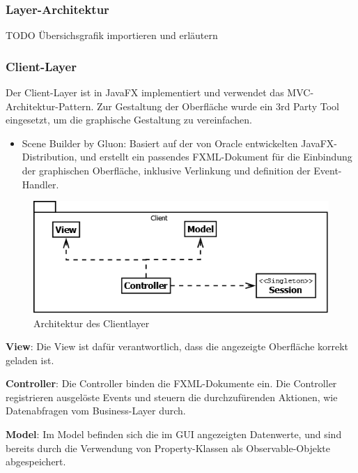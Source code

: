 \subsubsection{Layer-Architektur}
TODO Übersichsgrafik importieren und erläutern

\subsubsection{Client-Layer}
Der Client-Layer ist in JavaFX implementiert und verwendet das MVC-Architektur-Pattern. Zur Gestaltung der Oberfläche wurde ein 3rd Party Tool eingesetzt, um die graphische Gestaltung zu vereinfachen.
\begin{itemize}
\item Scene Builder by Gluon: Basiert auf der von Oracle entwickelten JavaFX-Distribution, und erstellt ein passendes FXML-Dokument für die Einbindung der graphischen Oberfläche, inklusive Verlinkung und definition der Event-Handler. 
\end{itemize}
\begin{figure}[H]
	\includegraphics[width=1.0\linewidth]{Images/ClientLayer-Architektur}
	\caption{Architektur des Clientlayer}
	\label{fig:clientlayer-architektur}
\end{figure}

\textbf{View}: Die View ist dafür verantwortlich, dass die angezeigte Oberfläche korrekt geladen ist.

\textbf{Controller}: Die Controller binden die FXML-Dokumente ein. Die Controller registrieren ausgelöste Events und steuern die durchzufürenden Aktionen, wie Datenabfragen vom Business-Layer durch.

\textbf{Model}: Im Model befinden sich die im GUI angezeigten Datenwerte, und sind bereits durch die Verwendung von Property-Klassen als Observable-Objekte abgespeichert.

